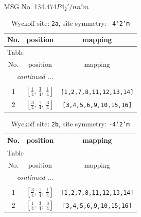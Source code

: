 \documentclass[fleqn,8pt]{jsarticle}
\begin{document}
\setcounter{MaxMatrixCols}{32}

\renewcommand{\tablename}{Table~}
\renewcommand{\figurename}{Figure~}
\begin{center}
\LARGE
MSG No. 134.474\quad$P4_{2}'/nn'm$
\end{center}
\renewcommand{\arraystretch}{1.2}
\begin{longtable}{ccc}
\caption{Wyckoff site: {\tt 2a}, site symmetry: {\tt -4'2'm}}
 \\
 \hline \hline
No. & position & mapping \\ \hline \endfirsthead

\multicolumn{2}{l}{\tablename\ \thetable{}} \\
 \hline \hline
No. & position & mapping \\ \hline \endhead

 \hline \hline
\multicolumn{2}{r}{\footnotesize\it continued ...} \\ \endfoot

 \hline \hline
\multicolumn{2}{r}{} \\ \endlastfoot

1 & $\left[ \frac{1}{4},\, \frac{3}{4},\, \frac{1}{4} \right]$ & {\tt [1,2,7,8,11,12,13,14]} \\ \hline
2 & $\left[ \frac{3}{4},\, \frac{1}{4},\, \frac{3}{4} \right]$ & {\tt [3,4,5,6,9,10,15,16]} \\
\end{longtable}
\renewcommand{\arraystretch}{1.2}
\begin{longtable}{ccc}
\caption{Wyckoff site: {\tt 2b}, site symmetry: {\tt -4'2'm}}
 \\
 \hline \hline
No. & position & mapping \\ \hline \endfirsthead

\multicolumn{2}{l}{\tablename\ \thetable{}} \\
 \hline \hline
No. & position & mapping \\ \hline \endhead

 \hline \hline
\multicolumn{2}{r}{\footnotesize\it continued ...} \\ \endfoot

 \hline \hline
\multicolumn{2}{r}{} \\ \endlastfoot

1 & $\left[ \frac{3}{4},\, \frac{1}{4},\, \frac{1}{4} \right]$ & {\tt [1,2,7,8,11,12,13,14]} \\ \hline
2 & $\left[ \frac{1}{4},\, \frac{3}{4},\, \frac{3}{4} \right]$ & {\tt [3,4,5,6,9,10,15,16]} \\
\end{longtable}
\end{document}
